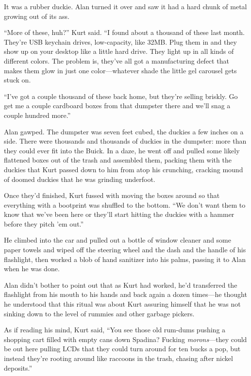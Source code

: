 \documentclass{article}
\begin{document}
It was a rubber duckie.  Alan turned it over and saw it had a hard
chunk of metal growing out of its ass.

``More of these, huh?'' Kurt said.  ``I found about a thousand of
these last month.  They're USB keychain drives, low-capacity, like
32MB.  Plug them in and they show up on your desktop like a little
hard drive.  They light up in all kinds of different colors.  The
problem is, they've all got a manufacturing defect that makes them
glow in just one color---whatever shade the little gel carousel gets
stuck on.

``I've got a couple thousand of these back home, but they're selling
briskly.  Go get me a couple cardboard boxes from that dumpster there
and we'll snag a couple hundred more.''

Alan gawped.  The dumpster was seven feet cubed, the duckies a few
inches on a side.  There were thousands and thousands of duckies in
the dumpster:  more than they could ever fit into the Buick.  In a
daze, he went off and pulled some likely flattened boxes out of the
trash and assembled them, packing them with the duckies that Kurt
passed down to him from atop his crunching, cracking mound of doomed
duckies that he was grinding underfoot.

Once they'd finished, Kurt fussed with moving the boxes around so that
everything with a bootprint was shuffled to the bottom.  ``We don't
want them to know that we've been here or they'll start hitting the
duckies with a hammer before they pitch 'em out.''

He climbed into the car and pulled out a bottle of window cleaner and
some paper towels and wiped off the steering wheel and the dash and
the handle of his flashlight, then worked a blob of hand sanitizer
into his palms, passing it to Alan when he was done.

Alan didn't bother to point out that as Kurt had worked, he'd
transferred the flashlight from his mouth to his hands and back again
a dozen times---he thought he understood that this ritual was about
Kurt assuring himself that he was not sinking down to the level of
rummies and other garbage pickers.

As if reading his mind, Kurt said, ``You see those old rum-dums
pushing a shopping cart filled with empty cans down Spadina?  Fucking
\textit{morons}---they could be out here pulling LCDs that they could
turn around for ten bucks a pop, but instead they're rooting around
like raccoons in the trash, chasing after nickel deposits.''
\end{document}
